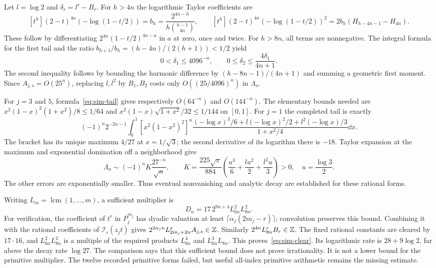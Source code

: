 Let $l=\log2$ and $\delta_r=l^r-B_r$. For $h>4n$ the logarithmic
Taylor coefficients are
\[
 [t^h](2-t)^{4n}(-\log(1-t/2))=b_h
      =\frac{2^{4n-h}}{h\binom{h-1}{4n}},\qquad
 [t^h](2-t)^{4n}(-\log(1-t/2))^2
                  =2b_h(H_{h-4n-1}-H_{4n}).
\]
These follow by differentiating $2^{4n}(1-t/2)^{4n-a}$ in $a$
at zero, once and twice. For $h>8n$, all terms are nonnegative.
The integral formula for the first tail and the ratio
$b_{h+1}/b_h=(h-4n)/(2(h+1))<1/2$ yield
\[
 0<\delta_1\leq4096^{-n},\qquad
 0\leq\delta_2\leq\frac{4\delta_1}{4n+1}.
\]
The second inequality follows by bounding the harmonic difference by
$(h-8n-1)/(4n+1)$ and summing a geometric first moment.
Since $A_{j,s}=O(25^n)$, replacing $l,l^2$ by $B_1,B_2$ costs only
$O((25/4096)^n)$ in $\Lambda_n$.

For $j=3$ and $5$, formula~\eqref{eq:sim-tail} gives respectively
$O(64^{-n})$ and $O(144^{-n})$. The elementary bounds needed are
$x^2(1-x)^2(1+x^2)/8\leq1/64$ and
$x^2(1-x)\sqrt{1+x^2}/32\leq1/144$ on $[0,1]$.
For $j=1$ the completed tail is exactly
\[
 (-1)^n2^{-2n-1}\int_0^1[x^2(1-x^2)^2]^n
 \frac{(-\log x)^3/6+l(-\log x)^2/2+l^2(-\log x)/3}
      {1+x^2/4}\dd x.
\]
The bracket has its unique maximum $4/27$ at $x=1/\sqrt3$; the
second derivative of its logarithm there is $-18$. Taylor expansion
at the maximum and exponential domination off a neighborhood give
\begin{equation}\label{eq:sim-rate}
 \Lambda_n\sim(-1)^n K\frac{27^{-n}}{\sqrt n},\qquad
 K=\frac{225\sqrt\pi}{884}
              \left(\frac{u^3}6+\frac{lu^2}2+\frac{l^2u}3\right)>0,
 \quad u=\frac{\log3}2.
\end{equation}
The other errors are exponentially smaller. Thus eventual nonvanishing
and analytic decay are established for these rational forms.

Writing $L_m=\operatorname{lcm}(1,\ldots,m)$, a sufficient multiplier is
\begin{equation}\label{eq:sim-clear}
 D_n=17\,2^{9n+4}L_{6n}^2L_{8n}^2.
\end{equation}
For verification, the coefficient of $t^r$ in $P_j^{m_j}$ has dyadic
valuation at least $\lceil\alpha_j(2m_j-r)\rceil$; convolution
preserves this bound. Combining it with the rational coefficients of
$\mathcal I_s(z_jt)$ gives
$2^{2\alpha_jn}L_{2m_j+2n}^sA_{j,s}\in\mathbb Z$.
Similarly $2^{4n}L_{8n}^rB_r\in\mathbb Z$.
The fixed rational constants are cleared by $17\cdot16$, and
$L_{6n}^2L_{8n}^2$ is a multiple of the required products
$L_{6n}^4$ and $L_{6n}^3L_{8n}$. This proves~\eqref{eq:sim-clear}.
Its logarithmic rate is $28+9\log2$, far above the decay rate
$\log27$. The comparison says that this sufficient bound does not
prove irrationality. It is not a lower bound for the primitive
multiplier. The twelve recorded primitive forms failed, but useful
all-index primitive arithmetic remains the missing estimate.

